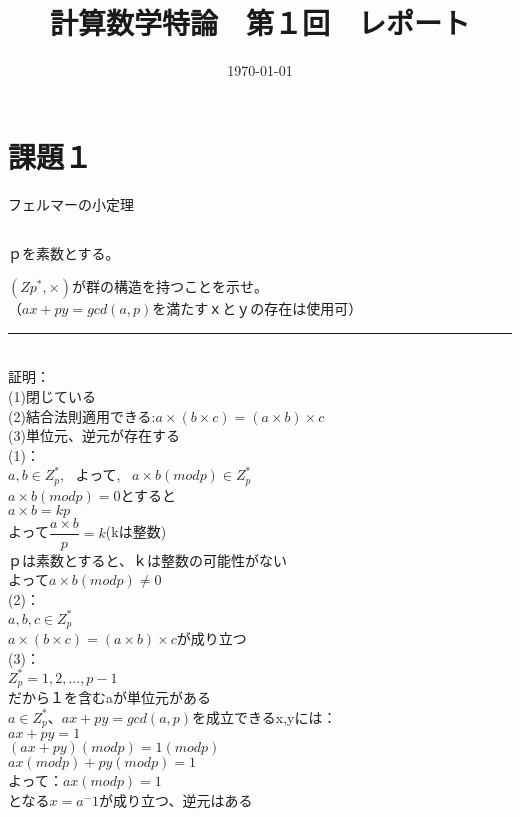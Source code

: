 \documentclass[twocolumn]{article}
\author{}
\title{計算数学特論　第１回　レポート}
\date{\today}
\begin{document}
  \maketitle

\section{課題１} フェルマーの小定理

\subsection{}
ｐを素数とする。\\
\begin{spacing}{1.5}
$(Zp^*,\times)$が群の構造を持つことを示せ。\\
（$ax+py=gcd(a,p)$を満たすｘとｙの存在は使用可）\\
\hrule
~\\
証明：\\
(1)閉じている\\
(2)結合法則適用できる:$a\times (b\times c)=(a\times b)\times c$\\
(3)単位元、逆元が存在する\\

(1)：\\
$a,b\in Z_p^*$, \ よって, \ $a\times b(modp)\in Z_p^*$\\
$a\times b(modp)=0$とすると\\
$a\times b=kp$\\
よって$\dfrac{a\times b}{p}=k$(kは整数)\\
ｐは素数とすると、ｋは整数の可能性がない\\
よって$a\times b(modp)\neq 0$\\

(2)：\\
$a,b,c\in Z_p^*$\\
$a\times (b\times c)=(a\times b)\times c$が成り立つ\\

(3)：\\
$Z_p^*={1,2,...,p-1}$\\
だから１を含むaが単位元がある\\
$a\in Z_p^*$、$ax+py=gcd(a,p)$を成立できるx,yには：\\
$ax+py=1$\\
$(ax+py)(modp)=1(modp)$\\
$ax(modp)+py(modp)=1$\\
よって：$ax(modp)=1$\\
となる$x=a^-1$が成り立つ、逆元はある\\


\end{spacing}
\end{document}
